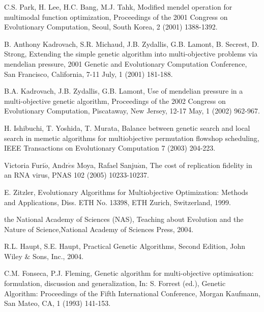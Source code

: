 \begin{thebibliography}{00}
 C.S. Park, H. Lee, H.C. Bang, M.J. Tahk,
            Modified mendel operation for multimodal function optimization,
             Proceedings of the 2001 Congress on Evolutionary Computation,
             Seoul, South Korea,
             2 (2001) 1388-1392. 


 B. Anthony Kadrovach, S.R. Michaud, J.B. Zydallis, G.B. Lamont, B. Secrest, D. Strong,
         Extending the simple genetic algorithm into multi-objective problems via mendelian pressure,
         2001 Genetic and Evolutionary Computation Conference,
         San Francisco,
         California,
          7-11 July,
1 (2001) 181-188.

 B.A. Kadrovach, J.B. Zydallis, G.B. Lamont,
            Use of mendelian pressure in a multi-objective genetic algorithm,
             Proceedings of the 2002 Congress on Evolutionary Computation,
             Piscataway, New Jersey,
             12-17 May,
             1 (2002) 962-967.

H. Ishibuchi, T. Yoshida, T. Murata, Balance between genetic search and local search in memetic algorithms for multiobjective permutation flowshop scheduling, IEEE Transactions on Evolutionary Computation 7 (2003) 204-223. 

Victoria Furi$\acute{o}$, Andr$\acute{e}$s Moya, Rafael Sanju$\acute{a}$n, The cost of replication fidelity in an RNA virus, PNAS 102 (2005) 10233-10237. 


E. Zitzler, Evolutionary Algorithms for Multiobjective Optimization: Methods and Applications, Diss. ETH No. 13398, ETH Zurich, Switzerland, 1999.

the National Academy of Sciences (NAS),
Teaching about Evolution and the Nature of Science,National Academy of Sciences Press, 2004.

R.L. Haupt, S.E. Haupt, Practical Genetic Algorithms, Second Edition, John Wiley $\&$ Sons, Inc., 2004.

 C.M. Fonseca, P.J. Fleming,
    Genetic algorithm for multi-objective optimisation: formulation,
             discussion and generalization,
             In: S. Forrest (ed.),
             Genetic Algorithm: Proceedings of the Fifth
             International Conference, Morgan Kaufmann, San Mateo, CA,
             1 (1993) 141-153.


\end{thebibliography}

